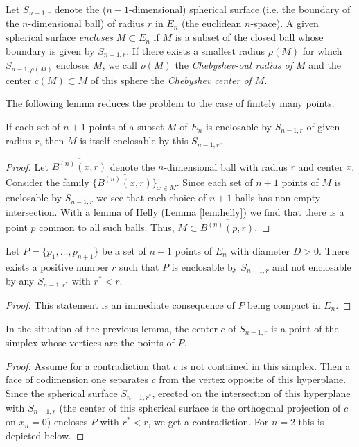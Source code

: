 \begin{definition}
	Let $S_{n-1,r}$ denote the ($n-1$-dimensional) spherical surface (i.e. the boundary of the $n$-dimensional ball) of radius $r$ in $E_n$ (the euclidean $n$-space). A given spherical surface \emph{encloses} $M\subset E_n$ if $M$ is a subset of the closed ball whose boundary is given by $S_{n-1,r}$. If there exists a smallest radius $\rho(M)$ for which $S_{n-1,\rho(M)}$ encloses $M$, we call $\rho(M)$ the \emph{Chebyshev-out radius of $M$} and the center $c(M)\subset M$ of this sphere the \emph{Chebyshev center of $M$}. 
\end{definition}

The following lemma reduces the problem to the case of finitely many points.

\begin{lemma}\label{lem:blumenthal-lem1}
	If each set of $n+1$ points of a subset $M$ of $E_n$ is enclosable by $S_{n-1,r}$ of given radius $r$, then $M$ is itself enclosable by this $S_{n-1,r}$.
\end{lemma}
\begin{proof}
	Let $\overline{B^{(n)}(x,r)}$ denote the $n$-dimensional ball with radius $r$ and center $x$. Consider the family $\{\overline{B^{(n)}(x,r)}\}_{x\in M}$. Since each set of $n+1$ points of $M$ is enclosable by $S_{n-1,r}$ we see that each choice of $n+1$ balls has non-empty intersection. With a lemma of Helly (Lemma \ref{lem:helly}) 
	we find that there is a point $p$ common to all such balls. Thus, $M\subset \overline{B^{(n)}(p,r)}$.
\end{proof}

\begin{lemma}\label{lem:blumenthal-lem2}
	Let $P=\{p_1,\dots, p_{n+1}\}$ be a set of $n+1$ points of $E_n$ with diameter $D>0$. There exists a positive number $r$ such that $P$ is enclosable by $S_{n-1,r}$ and not enclosable by any $S_{n-1,r^\ast}$ with $r^\ast< r$. 
\end{lemma}
\begin{proof}
	This statement is an immediate consequence of $P$ being compact in $E_n$.
\end{proof}

\begin{lemma}\label{blumenthal-property1}
	In the situation of the previous lemma, the center $c$ of $S_{n-1,r}$ is a point of the simplex whose vertices are the points of $P$.
\end{lemma}

\begin{proof}
	Assume for a contradiction that $c$ is not contained in this simplex. Then a face of codimension one separates $c$ from the vertex opposite of this hyperplane. Since the spherical surface $S_{n-1,r^\ast}$, erected on the intersection of this hyperplane with $S_{n-1,r}$ (the center of this spherical surface is the orthogonal projection of $c$ on $x_n=0$) encloses $P$ with $r^\ast<r$, we get a contradiction. For $n=2$ this is depicted below.
\end{proof}

